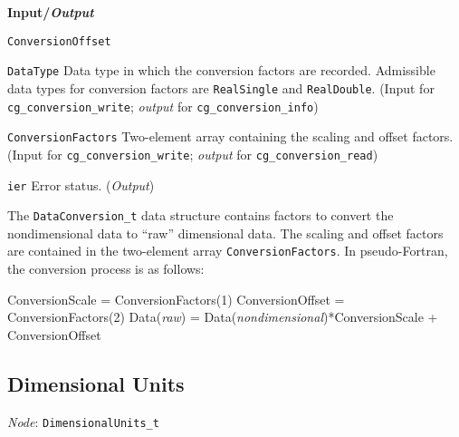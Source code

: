 \noindent
\textbf{\textcolor{input}{Input}/\textcolor{output}{\textit{Output}}}

\begin{Ventryi}{\texttt{ConversionOffset}}\raggedright
\item [\texttt{DataType}]
      Data type in which the conversion factors are recorded.
      Admissible data types for conversion factors are \texttt{RealSingle}
      and \texttt{RealDouble}.
      (\textcolor{input}{Input} for \texttt{cg\_conversion\_write};
      \textcolor{output}{\textit{output}} for \texttt{cg\_conversion\_info})
\item [\texttt{ConversionFactors}]
      Two-element array containing the scaling and offset factors.
      (\textcolor{input}{Input} for \texttt{cg\_conversion\_write};
      \textcolor{output}{\textit{output}} for \texttt{cg\_conversion\_read})
\item [\texttt{ier}]
      Error status.
      (\textcolor{output}{\textit{Output}})
\end{Ventryi}

The \texttt{DataConversion\_t} data structure contains factors to convert
the nondimensional data to ``raw'' dimensional data.
The scaling and offset factors are contained in the two-element array
\texttt{ConversionFactors}.
In pseudo-Fortran, the conversion process is as follows:

\begin{indlefttt}
ConversionScale  = ConversionFactors(1)
ConversionOffset = ConversionFactors(2)
Data(\textit{raw}) = Data(\textit{nondimensional})*ConversionScale + ConversionOffset
\end{indlefttt}

\subsection{Dimensional Units}
\label{s:dimensionalunits}

\noindent
\textit{Node}: \texttt{DimensionalUnits\_t}


